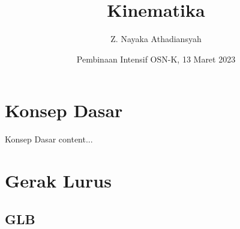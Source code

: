 \documentclass{beamer}
\title{Kinematika}
\author{Z. Nayaka Athadiansyah}
\institute[B-Bolt Fisika]{SMAN 3 Malang}
\date{Pembinaan Intensif OSN-K, 13 Maret 2023}
\theoremstyle{plain}
\theoremstyle{plain}
\theoremstyle{definition}
\numberwithin{equation}{section}
\begin{document}
	\begin{frame}
		\maketitle
	\end{frame}
	
	\section{Konsep Dasar}
	
	\begin{frame}{Konsep Dasar}
		content...
	\end{frame}
	
	\section{Gerak Lurus}
	\subsection{GLB}
	
\end{document}

